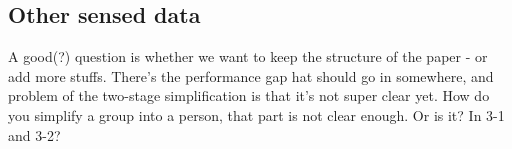 \subsection{Other sensed data}
    A good(?) question is whether we want to keep the structure of the paper - or add more stuffs. There's the performance gap hat should go in somewhere, and problem of the two-stage simplification is that it's not super clear yet. How do you simplify a group into a person, that part is not clear enough. Or is it? In 3-1 and 3-2?
